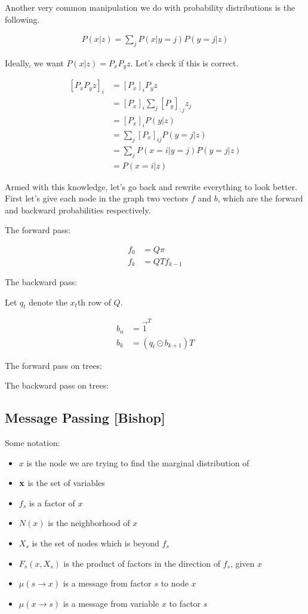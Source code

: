 \documentclass[12pt]{article}
\newcommand{\eq}[1]{\begin{align*}#1\end{align*}}
\newcommand{\itmz}[1]{\begin{itemize}#1\end{itemize}}
\begin{document}
Another very common manipulation we do with probability distributions is the following.

\eq{
  P(x|z) = \sum_j P(x|y=j)P(y=j|z)
}

Ideally, we want $P(x|z) = P_x P_y z$. Let's check if this is correct.

\eq{
  \left[ P_x P_y z \right]_i &= \left[P_x\right]_i P_y z \\
  &= [P_x]_{i} \sum_j [P_y]_{:j} z_j \\
  &= [P_x]_{i} P(y|z) \\
  &= \sum_j [P_x]_{ij} P(y=j|z) \\
  &= \sum_j P(x=i|y=j)P(y=j|z) \\
  &= P(x=i|z)
}

Armed with this knowledge, let's go back and rewrite everything to look better. First let's give each node in the graph two vectors $f$ and $b$, which are the forward and backward probabilities respectively. 

The forward pass:

\eq{
  f_0 &= Q\pi \\
  f_k &= Q T f_{k-1}
}

The backward pass:

Let $q_t$ denote the $x_t$th row of $Q$. 

\eq{
  b_n &= \vec 1^T \\
  b_k &= (q_t \odot b_{k+1})T
}

The forward pass on trees:

The backward pass on trees:

\subsection{Message Passing [Bishop]}

\newcommand{\msx}{\mu (s \rightarrow x)}
\newcommand{\mxs}{\mu (x \rightarrow s)}

Some notation:
\itmz{
  \item $x$ is the node we are trying to find the marginal distribution of
  \item $\mathbf{x}$ is the set of variables
  \item $f_s$ is a factor of $x$
  \item $N(x)$ is the neighborhood of $x$
  \item $X_s$ is the set of nodes which is beyond $f_s$
  \item $F_s(x, X_s)$ is the product of factors in the direction of $f_s$, given $x$
  \item $\msx$ is a message from factor $s$ to node $x$
  \item $\mxs$ is a message from variable $x$ to factor $s$
}
\end{document}
